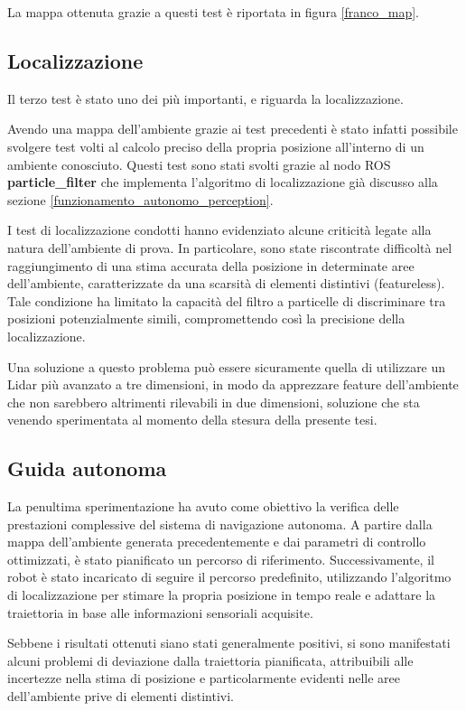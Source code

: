 \noindent La mappa ottenuta grazie a questi test è riportata in figura \ref{franco_map}.
\subsection{Localizzazione}
Il terzo test è stato uno dei più importanti, e riguarda la localizzazione.

\noindent Avendo una mappa dell'ambiente grazie ai test precedenti è stato infatti possibile svolgere test volti al calcolo preciso della propria posizione all'interno di un ambiente conosciuto. Questi test sono stati svolti grazie al nodo ROS \textbf{particle\_filter} che implementa l'algoritmo di localizzazione già discusso alla sezione \ref{funzionamento_autonomo_perception}.

\noindent I test di localizzazione condotti hanno evidenziato alcune criticità legate alla natura dell'ambiente di prova. In particolare, sono state riscontrate difficoltà nel raggiungimento di una stima accurata della posizione in determinate aree dell'ambiente, caratterizzate da una scarsità di elementi distintivi (featureless). Tale condizione ha limitato la capacità del filtro a particelle di discriminare tra posizioni potenzialmente simili, compromettendo così la precisione della localizzazione.

\noindent Una soluzione a questo problema può essere sicuramente quella di utilizzare un Lidar più avanzato a tre dimensioni, in modo da apprezzare feature dell'ambiente che non sarebbero altrimenti rilevabili in due dimensioni, soluzione che sta venendo sperimentata al momento della stesura della presente tesi.

\subsection{Guida autonoma}
La penultima sperimentazione ha avuto come obiettivo la verifica delle prestazioni complessive del sistema di navigazione autonoma. A partire dalla mappa dell'ambiente generata precedentemente e dai parametri di controllo ottimizzati, è stato pianificato un percorso di riferimento. Successivamente, il robot è stato incaricato di seguire il percorso predefinito, utilizzando l'algoritmo di localizzazione per stimare la propria posizione in tempo reale e adattare la traiettoria in base alle informazioni sensoriali acquisite.

\noindent Sebbene i risultati ottenuti siano stati generalmente positivi, si sono manifestati alcuni problemi di deviazione dalla traiettoria pianificata, attribuibili alle incertezze nella stima di posizione e particolarmente evidenti nelle aree dell'ambiente prive di elementi distintivi.

